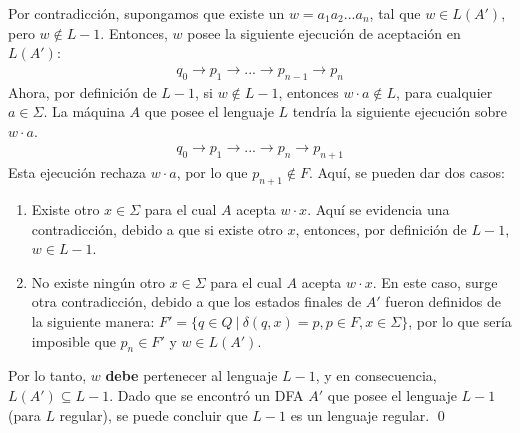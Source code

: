 \documentclass[letter]{article}
\begin{document}
\begin{pregunta}{1}
Por contradicción, supongamos que existe un $w = a_1a_2...a_n$, tal que $w \in L(A')$, pero $w \notin L - 1$. Entonces, $w$ posee la siguiente ejecución de aceptación en $L(A')$:
\begin{align*}
    q_0 \rightarrow p_1 \rightarrow ... \rightarrow p_{n-1} \rightarrow p_n
\end{align*}
Ahora, por definición de $L - 1$, si $w \notin L - 1$, entonces $w \cdot a \notin L$, para cualquier $a \in \Sigma$. La máquina $A$ que posee el lenguaje $L$ tendría la siguiente ejecución sobre $w \cdot a$.
\begin{align*}
    q_0 \rightarrow p_1 \rightarrow ... \rightarrow p_n \rightarrow p_{n + 1}
\end{align*}
Esta ejecución rechaza $w \cdot a$, por lo que $p_{n + 1} \notin F$. Aquí, se pueden dar dos casos: 
\begin{enumerate}
    \item Existe otro $x \in \Sigma$ para el cual $A$ acepta $w \cdot x$. Aquí se evidencia una contradicción, debido a que si existe otro $x$, entonces, por definición de $L - 1$, $w \in L - 1$.
    \item No existe ningún otro $x \in \Sigma$ para el cual $A$ acepta $w \cdot x$. En este caso, surge otra contradicción, debido a que los estados finales de $A'$ fueron definidos de la siguiente manera: $F' =  \{ q \in Q \ | \ \delta(q, x) = p, p \in F,  x \in \Sigma \}$, por lo que sería imposible que $p_{n} \in F'$ y $w \in L(A')$.
\end{enumerate}

Por lo tanto, $w$ \textbf{debe} pertenecer al lenguaje $L - 1$, y en consecuencia, $L(A') \subseteq L - 1$. Dado que se encontró un DFA $A'$ que posee el lenguaje $L - 1$ (para $L$ regular), se puede concluir que $L - 1$ es un lenguaje regular. \qed

\end{pregunta}
\end{document}
